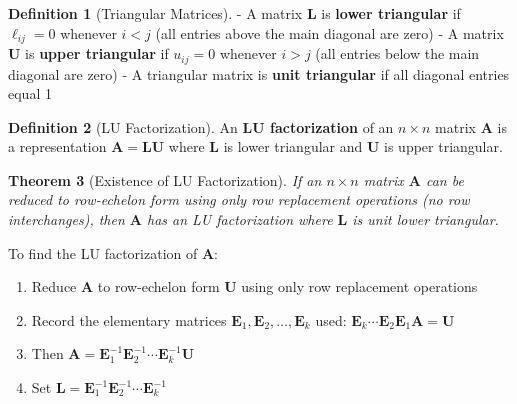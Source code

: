 \documentclass[12pt]{article}
\numberwithin{equation}{section}
\newcommand{\mat}[1]{\mathbf{#1}}        %
\theoremstyle{plain}
\newtheorem{theorem}{Theorem}[section]
\theoremstyle{definition}
\newtheorem{definition}[theorem]{Definition}
\theoremstyle{remark}
\begin{document}
\begin{definition}[Triangular Matrices]
- A matrix $\mat{L}$ is \textbf{lower triangular} if $\ell_{ij} = 0$ whenever $i < j$ (all entries above the main diagonal are zero)
- A matrix $\mat{U}$ is \textbf{upper triangular} if $u_{ij} = 0$ whenever $i > j$ (all entries below the main diagonal are zero)
- A triangular matrix is \textbf{unit triangular} if all diagonal entries equal 1
\end{definition}

\begin{definition}[LU Factorization]
An \textbf{LU factorization} of an $n \times n$ matrix $\mat{A}$ is a representation $\mat{A} = \mat{L}\mat{U}$ where $\mat{L}$ is lower triangular and $\mat{U}$ is upper triangular.
\end{definition}

\begin{theorem}[Existence of LU Factorization]
If an $n \times n$ matrix $\mat{A}$ can be reduced to row-echelon form using only row replacement operations (no row interchanges), then $\mat{A}$ has an LU factorization where $\mat{L}$ is unit lower triangular.
\end{theorem}

\begin{algorithm}[H]
\caption{Computing LU Factorization}
To find the LU factorization of $\mat{A}$:
\begin{enumerate}
\item Reduce $\mat{A}$ to row-echelon form $\mat{U}$ using only row replacement operations
\item Record the elementary matrices $\mat{E}_1, \mat{E}_2, \ldots, \mat{E}_k$ used: $\mat{E}_k \cdots \mat{E}_2 \mat{E}_1 \mat{A} = \mat{U}$
\item Then $\mat{A} = \mat{E}_1^{-1} \mat{E}_2^{-1} \cdots \mat{E}_k^{-1} \mat{U}$
\item Set $\mat{L} = \mat{E}_1^{-1} \mat{E}_2^{-1} \cdots \mat{E}_k^{-1}$
\end{enumerate}
\end{algorithm}
\end{document}
